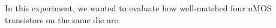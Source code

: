 In this experiment, we wanted to evaluate how well-matched four nMOS transistors on the same die are.